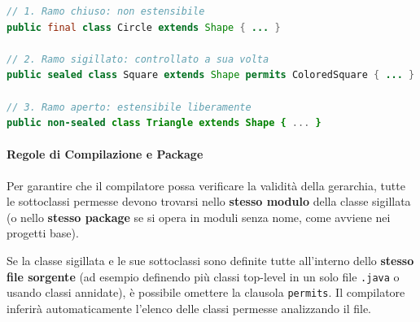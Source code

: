 \begin{lstlisting}[language=Java, caption={Esempio dei modificatori obbligatori}]
// 1. Ramo chiuso: non estensibile
public final class Circle extends Shape { ... }

// 2. Ramo sigillato: controllato a sua volta
public sealed class Square extends Shape permits ColoredSquare { ... }

// 3. Ramo aperto: estensibile liberamente
public non-sealed class Triangle extends Shape { ... }
\end{lstlisting}

\paragraph{Regole di Compilazione e Package}

Per garantire che il compilatore possa verificare la validità della gerarchia, tutte le sottoclassi permesse devono trovarsi nello \textbf{stesso modulo} della classe sigillata (o nello \textbf{stesso package} se si opera in moduli senza nome, come avviene nei progetti base).

\begin{observation}
    Se la classe sigillata e le sue sottoclassi sono definite tutte all'interno dello \textbf{stesso file sorgente} (ad esempio definendo più classi top-level in un solo file \texttt{.java} o usando classi annidate), è possibile omettere la clausola \texttt{permits}. Il compilatore inferirà automaticamente l'elenco delle classi permesse analizzando il file.
\end{observation}